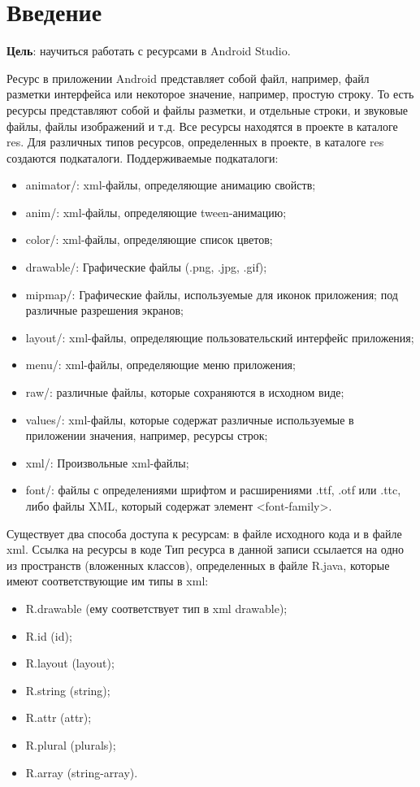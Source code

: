 \graphicspath{{./sixth/img}}

\section*{\LARGE{Введение}}
\textbf{Цель}: научиться работать с ресурсами в Android Studio.\par
Ресурс в приложении Android представляет собой файл, например, файл
разметки интерфейса или некоторое значение, например, простую строку. То
есть ресурсы представляют собой и файлы разметки, и отдельные строки, и
звуковые файлы, файлы изображений и т.д. Все ресурсы находятся в проекте
в каталоге res. Для различных типов ресурсов, определенных в проекте, в
каталоге res создаются подкаталоги. Поддерживаемые подкаталоги:

\begin{itemize}
	\item animator/: xml-файлы, определяющие анимацию свойств;
	\item anim/: xml-файлы, определяющие tween-анимацию;
	\item color/: xml-файлы, определяющие список цветов;
	\item drawable/: Графические файлы (.png, .jpg, .gif);
	\item mipmap/: Графические файлы, используемые для иконок приложения;
		под различные разрешения экранов;
	\item layout/: xml-файлы, определяющие пользовательский интерфейс
		приложения;
	\item menu/: xml-файлы, определяющие меню приложения;
	\item raw/: различные файлы, которые сохраняются в исходном виде;
	\item values/: xml-файлы, которые содержат различные используемые в
		приложении значения, например, ресурсы строк;
	\item xml/: Произвольные xml-файлы;
	\item font/: файлы с определениями шрифтом и расширениями .ttf, .otf или
		.ttc, либо файлы XML, который содержат элемент <font-family>.
\end{itemize}

Существует два способа доступа к ресурсам: в файле исходного кода и в
файле xml.
Ссылка на ресурсы в коде
Тип ресурса в данной записи ссылается на одно из пространств (вложенных
классов), определенных в файле R.java, которые имеют соответствующие им
типы в xml:

\begin{itemize}
	\item R.drawable (ему соответствует тип в xml drawable);
	\item R.id (id);
	\item R.layout (layout);
	\item R.string (string);
	\item R.attr (attr);
	\item R.plural (plurals);
	\item R.array (string-array).
\end{itemize}

